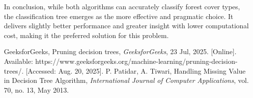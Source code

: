 \documentclass[conference]{IEEEtran}
\begin{document}
In conclusion, while both algorithms can accurately classify forest cover types, the classification tree emerges as the more effective and pragmatic choice. It delivers slightly better performance and greater insight with lower computational cost, making it the preferred solution for this problem.

\begin{thebibliography}{00}
 GeeksforGeeks, Pruning decision trees, {\em GeeksforGeeks}, 23 Jul, 2025. [Online]. Available: https://www.geeksforgeeks.org/machine-learning/pruning-decision-trees/. [Accessed: Aug. 20, 2025].
 P. Patidar, A. Tiwari, Handling Missing Value in Decision Tree Algorithm, {\em International Journal of Computer Applications}, vol. 70, no. 13, May 2013.
\end{thebibliography}
\vspace{12pt}
\end{document}
